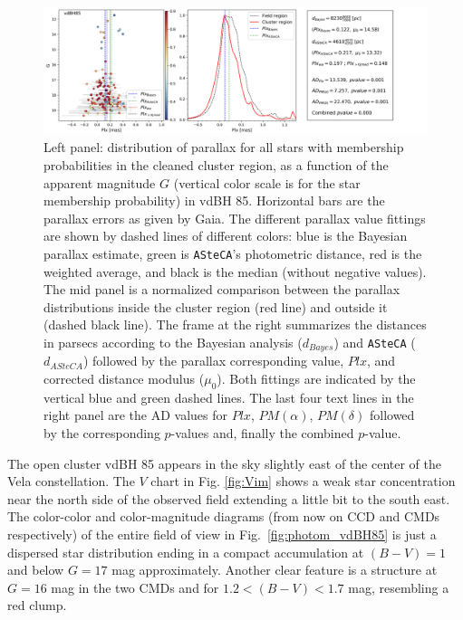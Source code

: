 \documentclass[draft]{aa}
\begin{document}
\begin{figure}[ht]
    \centering
    \includegraphics[width=\hsize]{../figs/plx_vdBH85.png}
\caption{Left panel: distribution of parallax for all stars with membership
probabilities in the cleaned cluster region, as a function of the apparent
magnitude $G$ (vertical color scale is for the star membership
probability) in vdBH 85.
Horizontal bars are the parallax errors as given by Gaia. The different
parallax value fittings are shown by dashed lines of different colors:
blue is the Bayesian parallax estimate, green is \texttt{ASteCA}'s
photometric distance, red is the weighted average, and black is the median 
(without negative values).
The mid panel is a normalized comparison between the parallax
distributions inside the cluster region (red line) and outside it (dashed
black line). The frame at the right summarizes the distances in parsecs
according to the Bayesian analysis ($d_{Bayes}$) and \texttt{ASteCA} ($d_
{ASteCA}$) followed by the parallax corresponding value, $Plx$, and
corrected distance modulus ($\mu_0$). Both fittings are indicated by the
vertical blue and green dashed lines. The last four text lines in the right
panel are the AD values for $Plx$, $PM(\alpha)$, $PM(\delta)$ followed by
the corresponding $p$-values and, finally the combined $p$-value.
}
    \label{fig:plx_bys_vdBH85}
\end{figure}

The open cluster vdBH 85 appears in the sky slightly east of the center of the
Vela constellation. The $V$ chart in Fig. \ref{fig:Vim} shows a weak star
concentration near the north side of the observed field extending a little bit
to the south east. 
%
The color-color and color-magnitude diagrams (from now on CCD and CMDs
respectively) of the entire field of view in Fig.~\ref{fig:photom_vdBH85} is
just a dispersed star distribution ending in a compact accumulation at
$(B-V)=1$ and below $G=17$ mag approximately. Another clear feature is a
structure at $G=16$ mag in the two CMDs and for $1.2<(B-V)<1.7$ mag, resembling
a red clump.\\
\end{document}
